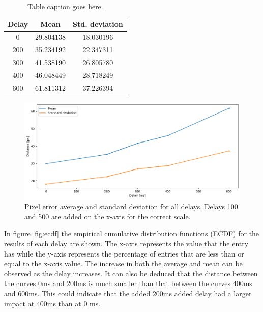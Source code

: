 \documentclass[nofilelist]{cslthse-msc}
\begin{document}
\begin{table}[ht]
   \centering
   \begin{tabular}{|c|c|c|}
   \hline
   \textbf{Delay} & \textbf{ Mean} & \textbf{Std. deviation} \\
   \hline
   0 & 29.804138 & 18.030196 \\ \hline
   200 & 35.234192 & 22.347311 \\ \hline
   300 & 41.538190 & 26.805780 \\ \hline
   400 & 46.048449 & 28.718249 \\ \hline
   600 & 61.811312 & 37.226394 \\ \hline
   \end{tabular}
   \caption{Table caption goes here.}
   \label{tab:averages}
\end{table}


\begin{figure}[!hbt]
   \centering
   \includegraphics[scale=0.5]{images/avg-std.png} 
   \caption{Pixel error average and standard deviation for all delays. Delays 100 and 500 are added on the x-axis for the correct scale.}
   \label{fig:avg-std}
\end{figure}

In figure \ref{fig:ecdf} the empirical cumulative distribution functions (ECDF) for the results of each delay are shown. The x-axis represents the value that the entry has while the y-axis represents the percentage of entries that are less than or equal to the x-axis value. The increase in both the average and mean can be observed as the delay increases. It can also be deduced that the distance between the curves 0ms and 200ms is much smaller than that between the curves 400ms and 600ms. This could indicate that the added 200ms added delay had a larger impact at 400ms than at 0 ms.
\end{document}
